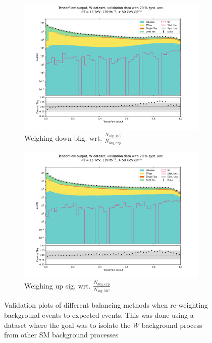 \documentclass[12pt, a4paper]{book}
\begin{document}
\begin{figure}[!ht]
\begin{subfigure}[b]{0.49\textwidth}
          \includegraphics[width=1\textwidth]{bkg_exp/VAL.pdf}
          \caption{Weighing down bkg. wrt. $\frac{N_{sig,MC}}{N_{bkg,exp}}$ }
       \end{subfigure}
       \hfill
       \begin{subfigure}[b]{0.49\textwidth}
          \centering
          \includegraphics[width=1\textwidth]{sig_exp/VAL.pdf}
          \caption{Weighing up sig. wrt. $\frac{N_{bkg,exp}}{N_{sig,MC}}$}
       \end{subfigure}
     \caption[Validation plots for re-weighting background to expected events on NNs]{Validation plots of different balancing methods when re-weighting background events to expected events. 
     This was done using a dataset where the goal was to isolate the $W$ background process from other SM background processes} \label{fig:WVAL_rw}
\end{figure}
\end{document}
